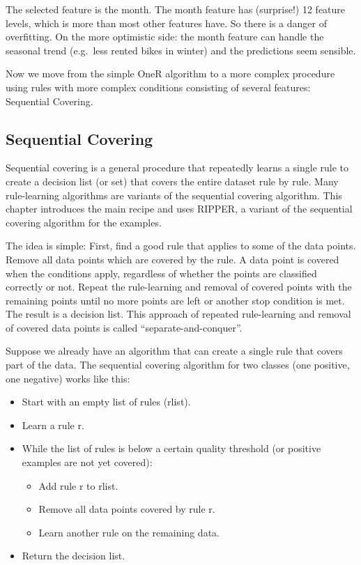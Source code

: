 \documentclass[
  11pt,
]{scrbook}
\providecommand{\tightlist}{%
  \setlength{\itemsep}{0pt}\setlength{\parskip}{0pt}}
\begin{document}
The selected feature is the month.
The month feature has (surprise!) 12 feature levels, which is more than most other features have.
So there is a danger of overfitting.
On the more optimistic side: the month feature can handle the seasonal trend (e.g.~less rented bikes in winter) and the predictions seem sensible.

Now we move from the simple OneR algorithm to a more complex procedure using rules with more complex conditions consisting of several features: Sequential Covering.

\hypertarget{sequential-covering}{%
\subsection{Sequential Covering}\label{sequential-covering}}

Sequential covering is a general procedure that repeatedly learns a single rule to create a decision list (or set) that covers the entire dataset rule by rule.
Many rule-learning algorithms are variants of the sequential covering algorithm.
This chapter introduces the main recipe and uses RIPPER, a variant of the sequential covering algorithm for the examples.

The idea is simple:
First, find a good rule that applies to some of the data points.
Remove all data points which are covered by the rule.
A data point is covered when the conditions apply, regardless of whether the points are classified correctly or not.
Repeat the rule-learning and removal of covered points with the remaining points until no more points are left or another stop condition is met.
The result is a decision list.
This approach of repeated rule-learning and removal of covered data points is called ``separate-and-conquer''.

Suppose we already have an algorithm that can create a single rule that covers part of the data.
The sequential covering algorithm for two classes (one positive, one negative) works like this:

\begin{itemize}
\tightlist
\item
  Start with an empty list of rules (rlist).
\item
  Learn a rule r.
\item
  While the list of rules is below a certain quality threshold (or positive examples are not yet covered):

  \begin{itemize}
  \tightlist
  \item
    Add rule r to rlist.
  \item
    Remove all data points covered by rule r.
  \item
    Learn another rule on the remaining data.
  \end{itemize}
\item
  Return the decision list.
\end{itemize}
\end{document}
